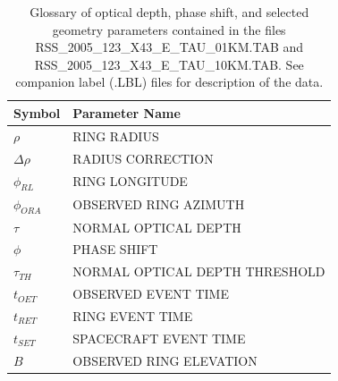 \documentclass[crop=false,class=book]{standalone}
\begin{document}
\begin{table}[H]
    \centering
    \begin{tabular}{l l}
        \hline
        Symbol			& Parameter Name \\
        \hline
        $\rho$			& RING RADIUS \\
        $\Delta\rho$		& RADIUS CORRECTION \\
        $\phi_{RL}$		& RING LONGITUDE \\
        $\phi_{ORA}$		& OBSERVED RING AZIMUTH \\
        $\tau$			& NORMAL OPTICAL DEPTH \\
        $\phi$			& PHASE SHIFT \\
        $\tau_{TH}$		& NORMAL OPTICAL DEPTH THRESHOLD \\
        $t_{OET}$			& OBSERVED EVENT TIME \\
        $t_{RET}$			& RING EVENT TIME \\
        $t_{SET}$			& SPACECRAFT EVENT TIME \\
        $B$				& OBSERVED RING ELEVATION \\
        \hline
    \end{tabular}
    \caption[Easy Data Parameters for Tau File]{Glossary of optical depth, phase shift, and selected geometry parameters contained in the files RSS\_2005\_123\_X43\_E\_TAU\_01KM.TAB and RSS\_2005\_123\_X43\_E\_TAU\_10KM.TAB. See companion label (.LBL) files for description of the data.}
\end{table}
\end{document}
